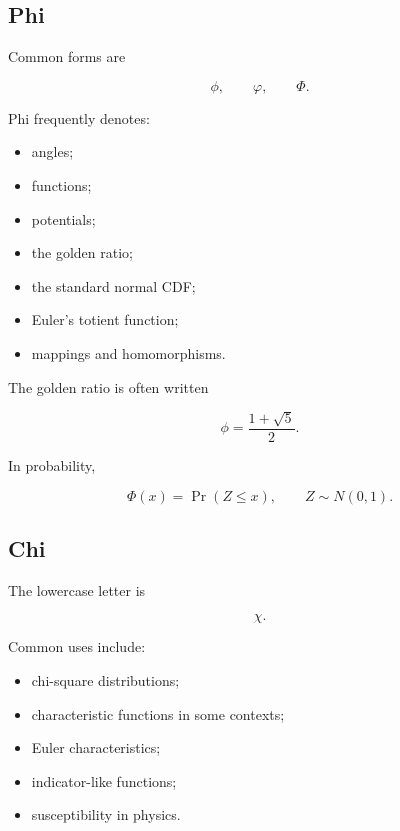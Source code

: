 \subsection{Phi}
\label{subsec:greek-phi}

Common forms are

\[
\boxed{
\phi,
\qquad
\varphi,
\qquad
\Phi.
}
\]

Phi frequently denotes:

\begin{itemize}
    \item angles;
    \item functions;
    \item potentials;
    \item the golden ratio;
    \item the standard normal CDF;
    \item Euler's totient function;
    \item mappings and homomorphisms.
\end{itemize}

The golden ratio is often written

\[
\boxed{
\phi
=
\frac{1+\sqrt5}{2}.
}
\]

In probability,

\[
\boxed{
\Phi(x)
=
\Pr(Z\leq x),
\qquad
Z\sim N(0,1).
}
\]

\subsection{Chi}
\label{subsec:greek-chi}

The lowercase letter is

\[
\boxed{
\chi.
}
\]

Common uses include:

\begin{itemize}
    \item chi-square distributions;
    \item characteristic functions in some contexts;
    \item Euler characteristics;
    \item indicator-like functions;
    \item susceptibility in physics.
\end{itemize}

